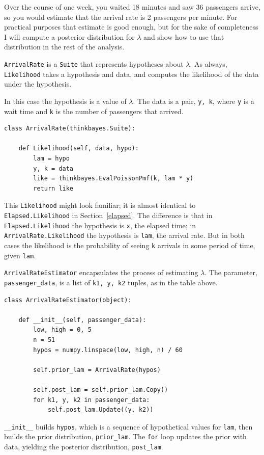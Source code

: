 \documentclass[12pt]{book}
\begin{document}
Over the course of one week, you waited 18 minutes and saw 36
passengers arrive, so you would estimate that the arrival rate is
2 passengers per minute.  For practical purposes that estimate is
good enough, but for the sake of completeness I
will compute a posterior distribution for $\lambda$ and show how
to use that distribution in the rest of the analysis.

{\tt ArrivalRate} is a {\tt Suite} that represents hypotheses about
$\lambda$.  As always, {\tt Likelihood} takes a hypothesis and data,
and computes the likelihood of the data under the hypothesis.

In this case the hypothesis is a value of $\lambda$.  The data is a
pair, {\tt y, k}, where {\tt y} is a wait time and {\tt k} is the
number of passengers that arrived.

\begin{verbatim}
class ArrivalRate(thinkbayes.Suite):

    def Likelihood(self, data, hypo):
        lam = hypo
        y, k = data
        like = thinkbayes.EvalPoissonPmf(k, lam * y)
        return like
\end{verbatim}

This {\tt Likelihood} might look familiar; it
is almost identical to {\tt Elapsed.Likelihood} in
Section~\ref{elapsed}.  The difference is that in {\tt
  Elapsed.Likelihood} the hypothesis is {\tt x}, the elapsed time; in
{\tt ArrivalRate.Likelihood} the hypothesis is {\tt lam}, the arrival
rate.  But in both cases the likelihood is the probability of seeing
{\tt k} arrivals in some period of time, given {\tt lam}.

{\tt ArrivalRateEstimator} encapsulates the process of estimating
$\lambda$.  The parameter, \verb"passenger_data", is a list
of {\tt k1, y, k2} tuples, as in the table above.

\begin{verbatim}
class ArrivalRateEstimator(object):

    def __init__(self, passenger_data):
        low, high = 0, 5
        n = 51
        hypos = numpy.linspace(low, high, n) / 60

        self.prior_lam = ArrivalRate(hypos)

        self.post_lam = self.prior_lam.Copy()
        for k1, y, k2 in passenger_data:
            self.post_lam.Update((y, k2))
\end{verbatim}

\verb"__init__" builds
{\tt hypos}, which is a sequence of hypothetical values for {\tt lam},
then builds the prior distribution, \verb"prior_lam".
The {\tt for} loop updates the prior with data, yielding the posterior
distribution, \verb"post_lam".
\end{document}

